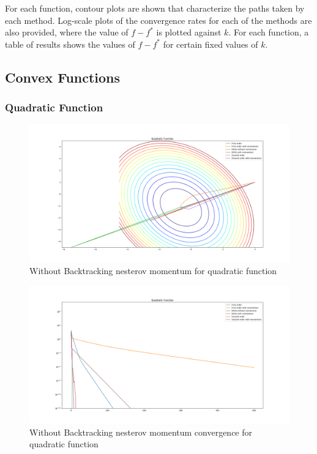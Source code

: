\documentclass{article}
\begin{document}
For each function, contour plots are shown that characterize the paths taken by each method. Log-scale plots of the convergence rates for each of the methods are also provided, where the value of $f-f^*$ is plotted against $k$. For each function, a table of results shows the values of $f-f^*$ for certain fixed values of $k$.

\subsection{Convex Functions}

\subsubsection{Quadratic Function}
\begin{center}
\begin{figure}[H]
	\includegraphics[width=\linewidth]{../Images/quadraticnesterov.png}
	\caption{Without Backtracking nesterov momentum for quadratic function}
	\label{fig:Without Backtracking nesterov momentum for quadratic function}
\end{figure}

\begin{figure}[H]
	\includegraphics[width=\linewidth]{../Images/quadraticnesterov1.png}
	\caption{Without Backtracking nesterov momentum convergence for quadratic function}
	\label{fig:Without Backtracking nesterov momentum convergence for quadratic function}
\end{figure}


\end{center}
\end{document}
